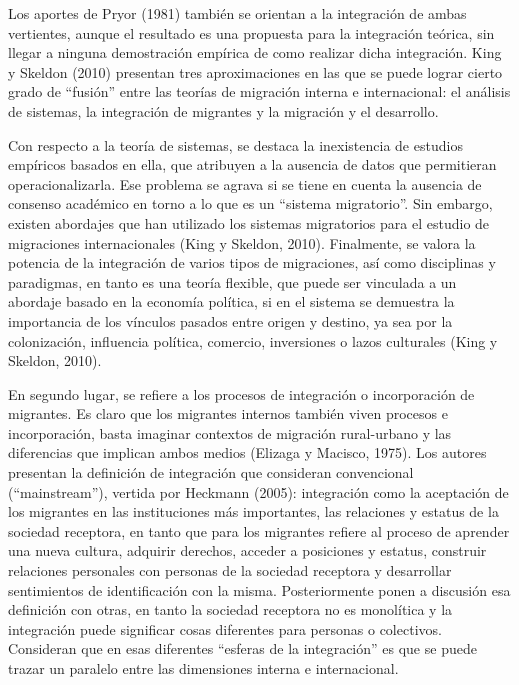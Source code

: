 \documentclass[12pt,spanish,]{article}
\begin{document}
Los aportes de Pryor (1981) también se orientan a la integración de
ambas vertientes, aunque el resultado es una propuesta para la
integración teórica, sin llegar a ninguna demostración empírica de como
realizar dicha integración. King y Skeldon (2010) presentan tres
aproximaciones en las que se puede lograr cierto grado de ``fusión''
entre las teorías de migración interna e internacional: el análisis de
sistemas, la integración de migrantes y la migración y el desarrollo.

Con respecto a la teoría de sistemas, se destaca la inexistencia de
estudios empíricos basados en ella, que atribuyen a la ausencia de datos
que permitieran operacionalizarla. Ese problema se agrava si se tiene en
cuenta la ausencia de consenso académico en torno a lo que es un
``sistema migratorio''. Sin embargo, existen abordajes que han utilizado
los sistemas migratorios para el estudio de migraciones internacionales
(King y Skeldon, 2010). Finalmente, se valora la potencia de la
integración de varios tipos de migraciones, así como disciplinas y
paradigmas, en tanto es una teoría flexible, que puede ser vinculada a
un abordaje basado en la economía política, si en el sistema se
demuestra la importancia de los vínculos pasados entre origen y destino,
ya sea por la colonización, influencia política, comercio, inversiones o
lazos culturales (King y Skeldon, 2010).

En segundo lugar, se refiere a los procesos de integración o
incorporación de migrantes. Es claro que los migrantes internos también
viven procesos e incorporación, basta imaginar contextos de migración
rural-urbano y las diferencias que implican ambos medios (Elizaga y
Macisco, 1975). Los autores presentan la definición de integración que
consideran convencional (``mainstream''), vertida por Heckmann (2005):
integración como la aceptación de los migrantes en las instituciones más
importantes, las relaciones y estatus de la sociedad receptora, en tanto
que para los migrantes refiere al proceso de aprender una nueva cultura,
adquirir derechos, acceder a posiciones y estatus, construir relaciones
personales con personas de la sociedad receptora y desarrollar
sentimientos de identificación con la misma. Posteriormente ponen a
discusión esa definición con otras, en tanto la sociedad receptora no es
monolítica y la integración puede significar cosas diferentes para
personas o colectivos. Consideran que en esas diferentes ``esferas de la
integración'' es que se puede trazar un paralelo entre las dimensiones
interna e internacional.
\end{document}

